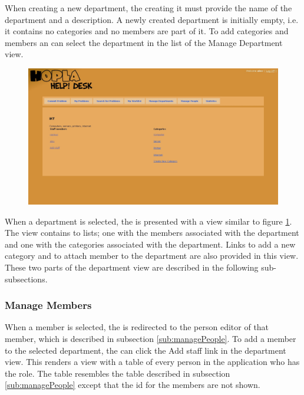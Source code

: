 When creating a new department, the \admin[] creating it must provide the name of the department and a description.
A newly created department is initially empty, i.e. it contains no categories and no \astaff[] members are part of it.
To add categories and \astaff[] members an \admin[] can select the department in the list of the Manage Department view.

\begin{figure}[htb]
	\centering
		\includegraphics[width=1.00\textwidth, clip=true, trim=2.9cm 6cm 10cm 8cm]{input/implementation/program_presentation/department.png}
	\label{fig:department}
\end{figure}

When a department is selected, the \admin[] is presented with a view similar to figure \ref{fig:department}.
The view contains to lists; one with the \astaff[] members associated with the department and one with the categories associated with the department.
Links to add a new category and to attach \astaff[] member to the department are also provided in this view.
These two parts of the department view are described in the following sub-subsections.

\subsubsection{Manage \astaff[c] Members}
When a \astaff[] member is selected, the \admin[] is redirected to the person editor of that \astaff[] member, which is described in subsection \ref{sub:managePeople}.
To add a \astaff[] member to the selected department, the \admin[] can click the Add staff link in the department view.
This renders a view with a table of every person in the application who has the \astaff[] role.
The table resembles the table described in subsection \ref{sub:managePeople} except that the id for the \astaff[] members are not shown.

